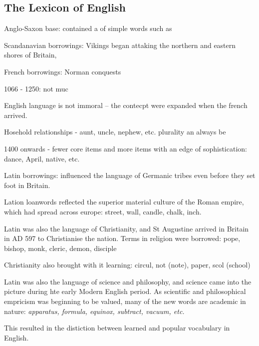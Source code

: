\documentclass[../main.tex]{subfiles}
\begin{document}
	\subsection{The Lexicon of English}
	Anglo-Saxon base: contained a of simple words such as  \par
	Scandanavian borrowings: Vikings began attaking the northern and eastern shores of Britain,  \par
	French borrowings: Norman conquests \par
	1066 - 1250: not muc \par
	English language is not immoral -- the contecpt were expanded when the french arrived.  \par
	Hosehold relationships - aunt, uncle, nephew, etc. plurality an always be \par
	1400 onwards - fewer core items and more items with an edge of sophistication: dance, April, native, etc. \par \par
	Latin borrowings: influenced the language of Germanic tribes even before they set foot in Britain.  \par
	Lation loanwords reflected the superior material culture of the Roman empire, which had spread across europe: street, wall, candle, chalk, inch. \par
	Latin was also the language of Christianity, and St Augustine arrived in Britain in AD 597 to Christianise the nation. Terms in religion were borrowed: pope, bishop, monk, cleric, demon, disciple \par
	Christianity also brought with it learning: circul, not (note), paper, scol (school) \par
	Latin was also the language of science and philosophy, and science came into the picture during hte early Modern English period. As scientific and philosophical empricism was beginning to be valued, many of the new words are academic in nature: \textit{apparatus, formula, equinox, subtract, vacuum, etc.} \par
	This resulted in the distiction between learned and popular vocabulary in English. \par
\end{document}
